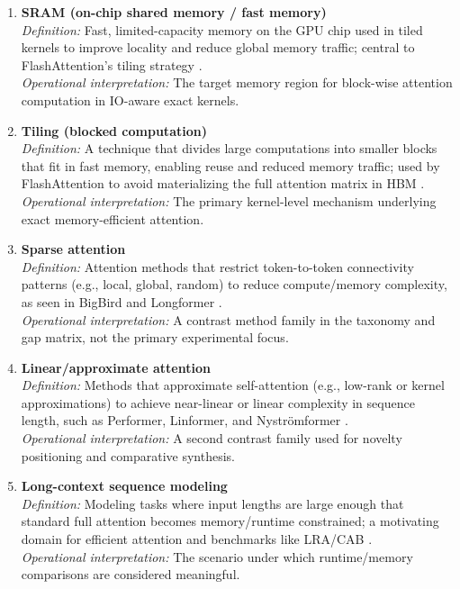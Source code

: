 \documentclass[12pt, a4paper]{article}
\begin{document}
\begin{enumerate}
\item \textbf{SRAM (on-chip shared memory / fast memory)} \\
\textit{Definition:} Fast, limited-capacity memory on the GPU chip used in tiled kernels to improve locality and reduce global memory traffic; central to FlashAttention's tiling strategy \parencite{dao2022flashattentionfastmemoryefficientexact}. \\
\textit{Operational interpretation:} The target memory region for block-wise attention computation in IO-aware exact kernels.

\item \textbf{Tiling (blocked computation)} \\
\textit{Definition:} A technique that divides large computations into smaller blocks that fit in fast memory, enabling reuse and reduced memory traffic; used by FlashAttention to avoid materializing the full attention matrix in HBM \parencite{dao2022flashattentionfastmemoryefficientexact}. \\
\textit{Operational interpretation:} The primary kernel-level mechanism underlying exact memory-efficient attention.

\item \textbf{Sparse attention} \\
\textit{Definition:} Attention methods that restrict token-to-token connectivity patterns (e.g., local, global, random) to reduce compute/memory complexity, as seen in BigBird and Longformer \parencite{zaheer2021bigbirdtransformerslonger, beltagy2020longformerlongdocumenttransformer}. \\
\textit{Operational interpretation:} A contrast method family in the taxonomy and gap matrix, not the primary experimental focus.

\item \textbf{Linear/approximate attention} \\
\textit{Definition:} Methods that approximate self-attention (e.g., low-rank or kernel approximations) to achieve near-linear or linear complexity in sequence length, such as Performer, Linformer, and Nystr\"{o}mformer \parencite{choromanski2022rethinkingattentionperformers, wang2020linformerselfattentionlinearcomplexity, xiong2021nystromformernystrombasedalgorithmapproximating}. \\
\textit{Operational interpretation:} A second contrast family used for novelty positioning and comparative synthesis.

\item \textbf{Long-context sequence modeling} \\
\textit{Definition:} Modeling tasks where input lengths are large enough that standard full attention becomes memory/runtime constrained; a motivating domain for efficient attention and benchmarks like LRA/CAB \parencite{tay2020longrangearenabenchmark, zhang2025cabcomprehensiveattentionbenchmarking}. \\
\textit{Operational interpretation:} The scenario under which runtime/memory comparisons are considered meaningful.


\end{enumerate}
\end{document}
